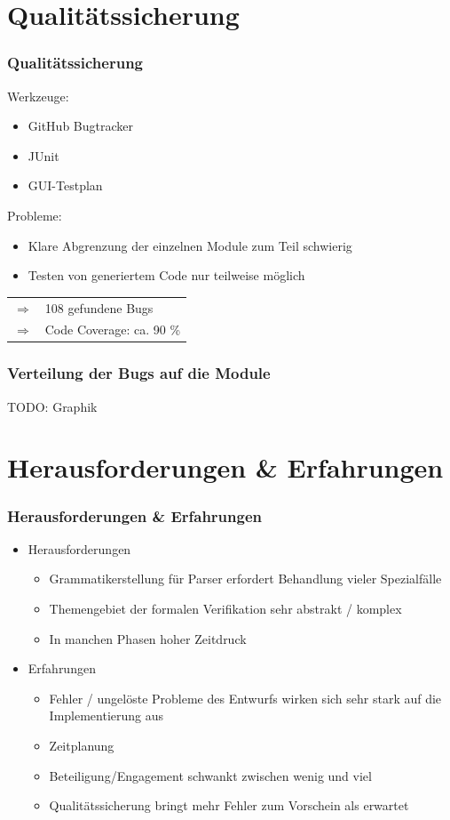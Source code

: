 \documentclass{beamer}
\begin{document}
\section{Qualit\"atssicherung}
\begin{frame}
\frametitle{Qualit\"atssicherung}
Werkzeuge:
\begin{itemize}
\item GitHub Bugtracker
\item JUnit
\item GUI-Testplan
\end{itemize}
\vspace{1\baselineskip}
Probleme:
\begin{itemize}
\item Klare Abgrenzung der einzelnen Module zum Teil schwierig
\item Testen von generiertem Code nur teilweise möglich
\end{itemize}
\vspace{1\baselineskip}
\begin{tabular}{p{1mm}p{10.9cm}}
$\Rightarrow$ & 108 gefundene Bugs\\
$\Rightarrow$ & Code Coverage: ca. 90 \%
\end{tabular}
\end{frame}

\begin{frame}
\frametitle{Verteilung der Bugs auf die Module}
TODO: Graphik
\end{frame}

\section{Herausforderungen \& Erfahrungen}
\begin{frame}
\frametitle{Herausforderungen \& Erfahrungen}
\begin{itemize}
\item Herausforderungen
\begin{itemize}
\item Grammatikerstellung für Parser erfordert Behandlung vieler
Spezialfälle
\item Themengebiet der formalen Verifikation sehr abstrakt / komplex
\item In manchen Phasen hoher Zeitdruck
\end{itemize}
\item Erfahrungen
\begin{itemize}
\item Fehler / ungelöste Probleme des Entwurfs wirken sich sehr stark
auf die Implementierung aus
\item Zeitplanung
\item Beteiligung/Engagement schwankt zwischen wenig und viel
\item Qualitätssicherung bringt mehr Fehler zum Vorschein als erwartet
\end{itemize}
\end{itemize}
\end{frame}
\end{document}

